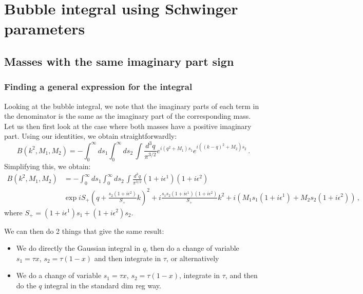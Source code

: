 \documentclass[twoside]{article}
\begin{document}
\section{Bubble integral using Schwinger parameters}

\subsection{Masses with the same imaginary part sign}
\subsubsection{Finding a general expression for the integral}
Looking at the bubble integral, we note that the imaginary parts of each term in the denominator is the same as the imaginary part of the corresponding mass. 
Let us then first look at the case where both masses have a positive imaginary part. Using our identities, we obtain straightforwardly:
\begin{equation}
\label{eq:bubble}
B(k^2,M_1,M_2)= - \int_0^\infty ds_1 \int_0^\infty ds_2\,\int \frac{d^3q}{\pi^{3/2}} e^{i(q^2+M_1)s_1}e^{i((k-q)^2+M_2)s_2}\,.
\end{equation}
Simplifying this, we obtain:
\begin{equation}
\begin{split}
B(k^2,M_1,M_2)&= - \int_0^\infty ds_1 \int_0^\infty ds_2\,\int \frac{d^3q}{\pi^{3/2}} (1 + i\epsilon^1)(1 + i\epsilon^2)\\
&\exp{i S_+ (q+ \frac{s_2(1 + i\epsilon^2)}{S_+}k)^2+i\frac{s_1 s_2(1 + i\epsilon^1)(1 + i\epsilon^2)}{S_+}k^2+ i (M_1 s_1(1 + i\epsilon^1) +M_2 s_2(1 + i\epsilon^2))}\,,
\end{split}
\end{equation}
where $S_+= (1 + i\epsilon^1)s_1+(1 + i\epsilon^2)s_2$.

We can then do 2 things that give the same result:
\begin{itemize}
\item We do directly the Gaussian integral in $q$, then do a change of variable $s_1 = \tau x$, $s_2 = \tau (1-x)$ and then integrate in $\tau$, or alternatively
\item We do a change of variable $s_1 = \tau x$, $s_2 = \tau (1-x)$, integrate in $\tau$, and then do the $q$ integral in the standard dim reg way.
\end{itemize} 
\end{document}
